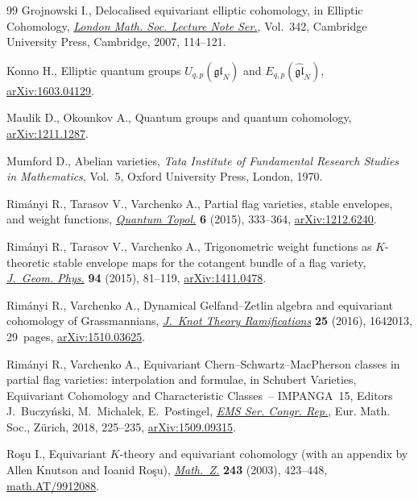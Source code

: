 \begin{thebibliography}{99}
Grojnowski I., Delocalised equivariant elliptic cohomology, in Elliptic
 Cohomology, \href{https://doi.org/10.1017/CBO9780511721489.007}{\textit{London Math. Soc. Lecture Note Ser.}}, Vol.~342, Cambridge
 University Press, Cambridge, 2007, 114--121.

Konno H., Elliptic quantum groups $U_{q,p}(\widehat{{\mathfrak{gl}}}_N)$ and
 $E_{q,p}(\widehat{{\mathfrak{gl}}}_N)$, \href{https://arxiv.org/abs/1603.04129}{arXiv:1603.04129}.

Maulik D., Okounkov A., Quantum groups and quantum cohomology,
 \href{https://arxiv.org/abs/1211.1287}{arXiv:1211.1287}.

Mumford D., Abelian varieties, \textit{Tata Institute of Fundamental Research
 Studies in Mathematics}, Vol.~5, Oxford University Press, London, 1970.

Rim\'{a}nyi R., Tarasov V., Varchenko A., Partial flag varieties, stable
 envelopes, and weight functions, \href{https://doi.org/10.4171/QT/65}{\textit{Quantum Topol.}} \textbf{6} (2015),
 333--364, \href{https://arxiv.org/abs/1212.6240}{arXiv:1212.6240}.

Rim\'{a}nyi R., Tarasov V., Varchenko A., Trigonometric weight functions as
 {$K$}-theoretic stable envelope maps for the cotangent bundle of a flag
 variety, \href{https://doi.org/10.1016/j.geomphys.2015.04.002}{\textit{J.~Geom. Phys.}} \textbf{94} (2015), 81--119,
 \href{https://arxiv.org/abs/1411.0478}{arXiv:1411.0478}.

Rim\'{a}nyi R., Varchenko A., Dynamical {G}elfand--{Z}etlin algebra and
 equivariant cohomology of {G}rassman\-nians, \href{https://doi.org/10.1142/S021821651642013X}{\textit{J.~Knot Theory
 Ramifications}} \textbf{25} (2016), 1642013, 29~pages, \href{https://arxiv.org/abs/1510.03625}{arXiv:1510.03625}.

Rim\'{a}nyi R., Varchenko A., Equivariant {C}hern--{S}chwartz--{M}ac{P}herson
 classes in partial flag varieties: inter\-po\-lation and formulae, in Schubert
 Varieties, Equivariant Cohomology and Characteristic Classes~-- {IMPANGA}~15,
 Editors J.~Buczy\'nski, M.~Michalek, E.~Postingel, \href{https://doi.org/10.4171/182-1/10}{\textit{EMS Ser. Congr. Rep.}}, Eur.
 Math. Soc., Z\"{u}rich, 2018, 225--235, \href{https://arxiv.org/abs/1509.09315}{arXiv:1509.09315}.

Ro\c{s}u I., Equivariant {$K$}-theory and equivariant cohomology (with an appendix
 by {A}llen {K}nutson and {I}oanid {R}o\c{s}u), \href{https://doi.org/10.1007/s00209-002-0447-1}{\textit{Math.~Z.}} \textbf{243}
 (2003), 423--448, \href{https://arxiv.org/abs/math.AT/9912088}{math.AT/9912088}.


\end{thebibliography}
